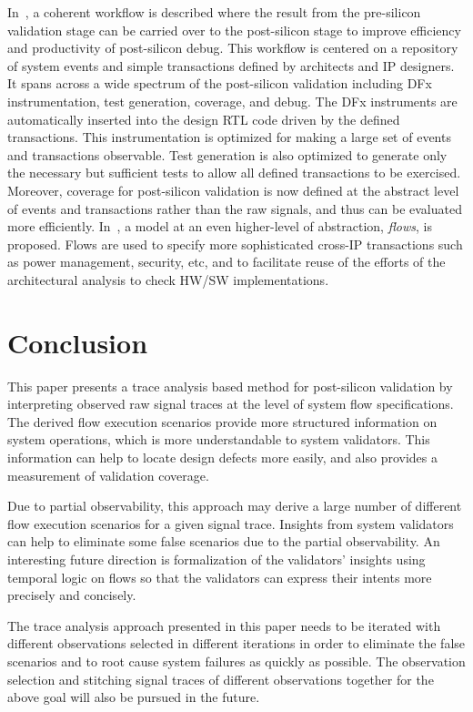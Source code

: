 \documentclass[conference]{IEEEtran}
\begin{document}
In~\cite{Singerman2011DAC}, a coherent workflow is described where the result from the pre-silicon validation stage can be carried over to the post-silicon stage to improve efficiency and productivity of post-silicon debug.  This workflow is centered on a repository of system events and simple transactions defined by architects and IP designers.  It spans across a wide spectrum of the post-silicon validation including DFx instrumentation, test generation, coverage, and debug.  The DFx instruments are automatically inserted into the design RTL code driven by the defined transactions.  This instrumentation is optimized for making a large set of events and transactions observable.   Test generation is also optimized to generate only the necessary but sufficient tests to allow all defined transactions to be exercised.   Moreover, coverage for post-silicon validation is now defined at the abstract level of events and transactions rather than the raw signals, and thus can be evaluated more efficiently.  In~\cite{Abarbanel2014DAC}, a model at an even higher-level of abstraction, {\em flows}, is proposed.  Flows are used to specify more sophisticated cross-IP transactions such as power management, security, etc, and to facilitate reuse of the efforts of the architectural analysis to check HW/SW implementations. 


%
\section{Conclusion}

This paper presents a trace analysis based method for post-silicon validation by interpreting observed raw signal traces at the level of system flow specifications.  The derived flow execution scenarios provide more structured information on system operations, which is more understandable to system validators.   This information can help to locate design defects more easily, and also provides a measurement of validation coverage.  

Due to partial observability, this approach may derive a large number of different flow execution scenarios for a given signal trace.  Insights from system validators can help to eliminate some false scenarios due to the partial observability.  An interesting future direction is formalization of the validators' insights using temporal logic on flows so that the validators can express their intents more precisely and concisely. 

The trace analysis approach presented in this paper needs to be iterated with different observations selected in different iterations in order to eliminate the false scenarios and to root cause system failures as quickly as possible.  The observation selection and stitching signal traces of different observations together for the above goal will also be pursued in the future.
\end{document}
